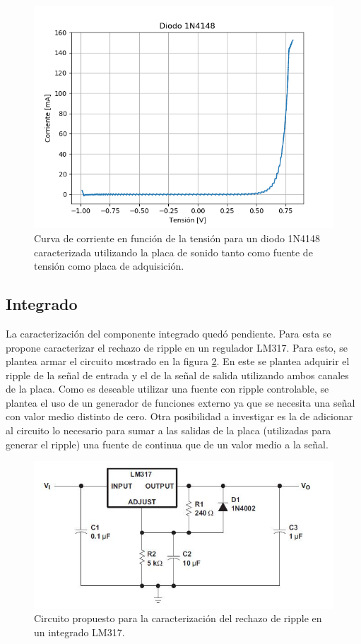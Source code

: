 \documentclass[a4paper,11pt]{article}
\begin{document}
	\begin{figure}[h]
		\centering
		\includegraphics[width=\textwidth]{imagenes/Diodo1N4148.png}
		\caption{Curva de corriente en función de la tensión para un diodo 1N4148 caracterizada utilizando la placa de sonido tanto como fuente de tensión como placa de adquisición.}
		\label{fig:diodo}
	\end{figure}
	
	\subsection{Integrado}	\label{sec:integrado}
	
	La caracterización del componente integrado quedó pendiente. Para esta se propone caracterizar el rechazo de ripple en un regulador LM317. Para esto, se plantea armar el circuito mostrado en la figura \ref{fig:lm317}. En este se plantea adquirir el ripple de la señal de entrada y el de la señal de salida utilizando ambos canales de la placa. Como es deseable utilizar una fuente con ripple controlable, se plantea el uso de un generador de funciones externo ya que se necesita una señal con valor medio distinto de cero. Otra posibilidad a investigar es la de adicionar al circuito lo necesario para sumar a las salidas de la placa (utilizadas para generar el ripple) una fuente de continua que de un valor medio a la señal.
		
	\begin{figure}[h]
		\centering
		\includegraphics[width=\textwidth]{imagenes/circuitolm317.jpg}
		\caption{Circuito propuesto para la caracterización del rechazo de ripple en un integrado LM317.}
		\label{fig:lm317}
	\end{figure}
\end{document}
